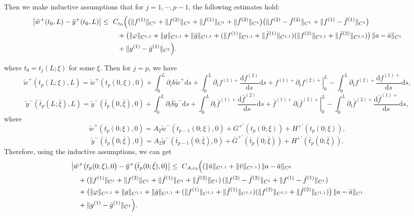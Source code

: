 \documentclass[a4paper,reqno,11pt]{amsart}
\numberwithin{equation}{section} %
\begin{document}
Then we make inductive assumptions that for $j=1,\cdots,p-1$, the following estimates hold:
\[
\begin{aligned}
\bigl|\tilde w^+(t_0,L)-\tilde y ^+(t_0,L)\bigr|
\le{}&\ C_{\varepsilon_0}\Bigl(
  \bigl(\|f^{(1)}\|_{C^{1}}+\|f^{(2)}\|_{C^{1}}
       +\|\bar f^{(1)}\|_{C^{1}}+\|\bar f^{(2)}\|_{C^{1}}\bigr)
  \bigl(\|f^{(2)}-\bar f^{(2)}\|_{C^{1}}
       +\|f^{(1)}-\bar f^{(1)}\|_{C^{1}}\bigr)
\\
&\quad
  + \bigl(\|\varphi\|_{C^{1,1}}+\|g\|_{C^{1,1}}+\|\bar g\|_{C^{1,1}}
     + (\|f^{(1)}\|_{C^{1,1}}+\|\bar f^{(1)}\|_{C^{1,1}})
       (\|f^{(2)}\|_{C^{1,1}}+\|\bar f^{(2)}\|_{C^{1,1}})\bigr)
       \,\|a-\bar a\|_{C^{1}}
\\
&\quad
  + \|g^{(1)}-\bar g^{(1)}\|_{C^{1}}
\Bigr).
\end{aligned}
\]

where $t_0=t_j(L;\xi)$ for some $\xi$. Then for $j=p$, we have
$$
\tilde{w}^+\left( t_p(L;\xi ),L \right) =\tilde{w}^+(t_p(0,\xi ),0)+\int_0^L{\partial _tb\tilde{w}^+\mathrm{d}s}+\int_0^L{\partial _tf^{(1)+}\frac{\mathrm{d}f^{(2)}}{\mathrm{d}s}\mathrm{d}s}+\left. f^{(1)+}\partial _tf^{(2)+} \right|_{0}^{L}-\int_0^L{\partial _t{f}^{(2)+}\frac{\mathrm{d}{f}^{(1)+}}{\mathrm{d}s}\mathrm{d}s},
$$
$$
\tilde{y}^-\left( \bar{t}_p(L;\bar{\xi}),L \right) =\tilde{y}^-(\bar{t}_p(0,\bar{\xi}),0)+\int_0^L{\partial _t\bar{b}\tilde{y}^-\mathrm{d}s}+\int_0^L{\partial _t\bar{f}^{(1)+}\frac{\mathrm{d}\bar{f}^{(2)}}{\mathrm{d}s}\mathrm{d}s}+\left. \bar{f}^{(1)+}\partial _t\bar{f}^{(2)+} \right|_{0}^{L}-\int_0^L{\partial _t{\bar{f}}^{(2)+}\frac{\mathrm{d}{\bar{f}}^{(1)+}}{\mathrm{d}s}\mathrm{d}s},
$$
where
$$
\tilde{w}^+\left( t_p\left( 0;\xi \right) ,0 \right) =A_2\tilde{w}^-\left( t_{p-1}\left( 0;\xi \right) ,0 \right) +G^{+ \prime}\left( t_p(0;\xi ) \right) +H^{+\prime}\left( t_p(0;\xi ) \right), 
$$
$$
\tilde{y}^-\left( \bar{t}_p\left( 0;\bar{\xi} \right) ,0 \right) =A_2\tilde{y}^-\left( \bar{t}_{p-1}\left( 0;\bar{\xi} \right) ,0 \right) +\bar{G}^{+\prime}\left( \bar{t}_p(0;\bar{\xi}) \right) +H^{+ \prime}\left( \bar{t}_p(0;\bar{\xi}) \right) .
$$
Therefore, using the inductive assumptions, we can get
\[
\begin{aligned}
&\bigl|\tilde w^+\bigl(t_p(0;\xi),0\bigr)-\tilde y ^+\bigl(\bar t_p(0;\bar\xi),0\bigr)\bigr|
\le{}\ C_{A,\varepsilon_0}\Bigl(
  (\|\tilde u\|_{C^{1,1}}+\|\tilde v\|_{C^{1,1}})\,\|a-\bar a\|_{C^{0}} \\
&\quad
  + (\|f^{(1)}\|_{C^{1}}+\|f^{(2)}\|_{C^{1}}
     +\|\bar f^{(1)}\|_{C^{1}}+\|\bar f^{(2)}\|_{C^{1}})\,
    (\|f^{(2)}-\bar f^{(2)}\|_{C^{1}}+\|f^{(1)}-\bar f^{(1)}\|_{C^{1}}) \\
&\quad
  + \bigl(\|\varphi\|_{C^{1,1}}+\|g\|_{C^{1,1}}+\|\bar g\|_{C^{1,1}}
     + (\|f^{(1)}\|_{C^{1,1}}+\|\bar f^{(1)}\|_{C^{1,1}})
       (\|f^{(2)}\|_{C^{1,1}}+\|\bar f^{(2)}\|_{C^{1,1}})\bigr)\,
    \|a-\bar a\|_{C^{1}} \\
&\quad
  + \|g^{(1)}-\bar g^{(1)}\|_{C^{1}}
\Bigr).
\end{aligned}
\]
\end{document}
